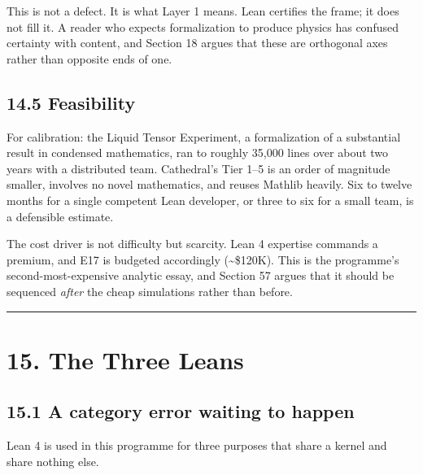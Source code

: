 \documentclass[
  11pt]{report}
\begin{document}
This is not a defect. It is what Layer 1 means. Lean certifies the
frame; it does not fill it. A reader who expects formalization to
produce physics has confused certainty with content, and Section 18
argues that these are orthogonal axes rather than opposite ends of one.

\hypertarget{feasibility}{%
\section{14.5 Feasibility}\label{feasibility}}

For calibration: the Liquid Tensor Experiment, a formalization of a
substantial result in condensed mathematics, ran to roughly 35,000 lines
over about two years with a distributed team. Cathedral's Tier 1--5 is
an order of magnitude smaller, involves no novel mathematics, and reuses
Mathlib heavily. Six to twelve months for a single competent Lean
developer, or three to six for a small team, is a defensible estimate.

The cost driver is not difficulty but scarcity. Lean 4 expertise
commands a premium, and E17 is budgeted accordingly
(\textasciitilde\$120K). This is the programme's second-most-expensive
analytic essay, and Section 57 argues that it should be sequenced
\emph{after} the cheap simulations rather than before.

\begin{center}\rule{0.5\linewidth}{0.5pt}\end{center}

\hypertarget{the-three-leans}{%
\chapter{15. The Three Leans}\label{the-three-leans}}

\hypertarget{a-category-error-waiting-to-happen}{%
\section{15.1 A category error waiting to
happen}\label{a-category-error-waiting-to-happen}}

Lean 4 is used in this programme for three purposes that share a kernel
and share nothing else.
\end{document}
